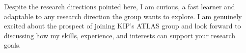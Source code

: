 \documentclass[11pt, a4paper]{awesome-cv}
\begin{document}
\begin{cvletter}
Despite the research directions pointed here, I am curious, a fast learner and adaptable to any research direction the group wants to explore. I am genuinely excited about the prospect of joining KIP's ATLAS group and look forward to discussing how my skills, experience, and interests can support your research goals.

\end{cvletter}


\makeletterclosing
\end{document}
